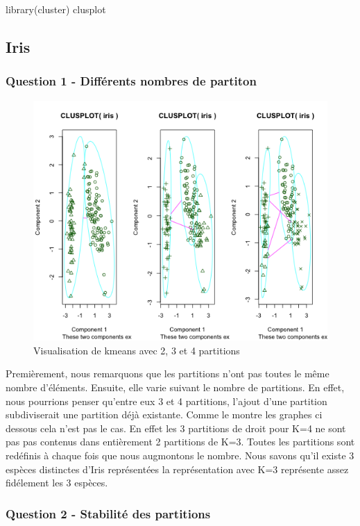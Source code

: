 \documentclass{article}\usepackage[]{graphicx}\usepackage[]{color}
\begin{document}
library(cluster)
clusplot 
\subsection*{Iris}

\subsubsection*{Question 1 - Différents nombres de partiton}

\begin{figure}
\includegraphics[width=\textwidth]{ex2_iris_1.png}
\caption{Visualisation de kmeans avec 2, 3 et 4 partitions}
\end{figure}

Premièrement, nous remarquons que les partitions n'ont pas toutes le même nombre d'éléments. 
Ensuite, elle varie suivant le nombre de partitions. En effet, nous pourrions penser qu'entre eux 3 et 4 partitions, l'ajout d'une partition subdiviserait une partition déjà existante. Comme le montre les graphes ci dessous cela n'est pas le cas. En effet les 3 partitions de droit pour K=4 ne sont pas pas contenus dans entièrement 2 partitions de K=3. Toutes les partitions sont redéfinis à chaque fois que nous augmontons le nombre. 
Nous savons qu'il existe 3 espèces distinctes d'Iris représentées la représentation avec K=3 représente assez fidélement les 3 espèces. 
\subsubsection*{Question 2 - Stabilité des partitions}
\end{document}
